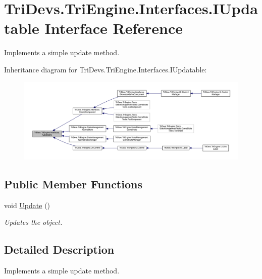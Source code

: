 \hypertarget{interface_tri_devs_1_1_tri_engine_1_1_interfaces_1_1_i_updatable}{\section{Tri\-Devs.\-Tri\-Engine.\-Interfaces.\-I\-Updatable Interface Reference}
\label{interface_tri_devs_1_1_tri_engine_1_1_interfaces_1_1_i_updatable}
}


Implements a simple update method.  




Inheritance diagram for Tri\-Devs.\-Tri\-Engine.\-Interfaces.\-I\-Updatable\-:
\nopagebreak
\begin{figure}[H]
\begin{center}
\leavevmode
\includegraphics[width=350pt]{interface_tri_devs_1_1_tri_engine_1_1_interfaces_1_1_i_updatable__inherit__graph}
\end{center}
\end{figure}
\subsection*{Public Member Functions}
\begin{DoxyCompactItemize}
\item 
void \hyperlink{interface_tri_devs_1_1_tri_engine_1_1_interfaces_1_1_i_updatable_a5392174d0eb92b04a0ef1908ce725f29}{Update} ()
\begin{DoxyCompactList}\small\item\em Updates the object. \end{DoxyCompactList}\end{DoxyCompactItemize}


\subsection{Detailed Description}
Implements a simple update method. 



